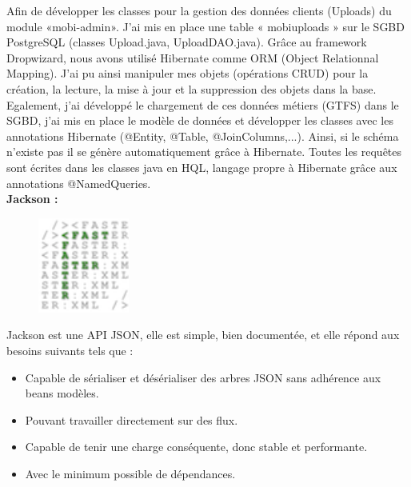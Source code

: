 \begin{itemize}
Afin de développer les classes pour la gestion des données clients (Uploads) du module «mobi-admin». J'ai mis en place une table « mobiuploads » sur le SGBD PostgreSQL (classes Upload.java, UploadDAO.java).
Grâce au framework Dropwizard, nous avons utilisé Hibernate comme ORM (Object Relationnal Mapping). J'ai pu ainsi manipuler mes objets (opérations CRUD) pour la création, la lecture, la mise à jour et la suppression des objets dans la base. 
Egalement, j'ai développé le chargement de ces données métiers (GTFS) dans le SGBD, j'ai mis en place le modèle de données et développer les classes avec les annotations Hibernate (@Entity, @Table, @JoinColumns,...). Ainsi, si le schéma n'existe pas il se génère automatiquement grâce à Hibernate. 
Toutes les requêtes sont écrites dans les classes java en HQL, langage propre à Hibernate grâce aux annotations @NamedQueries. \\


\textbf{Jackson :}

\begin{figure}
\centering
\includegraphics[width=3cm]{images/fxml_logo_Jackson.png}
\end{figure}
\noindent Jackson est une API JSON, elle est simple, bien documentée, et elle répond aux besoins suivants tels que :
\begin{itemize}
\item Capable de sérialiser et désérialiser des arbres JSON sans adhérence aux beans modèles.
\item Pouvant travailler directement sur des flux.
\item Capable de tenir une charge conséquente, donc stable et performante.
\item Avec le minimum possible de dépendances.
\end{itemize}


\end{itemize}
